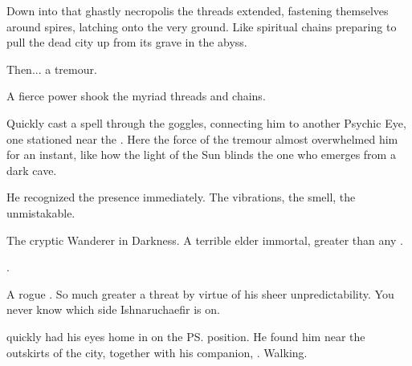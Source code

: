 Down into that ghastly necropolis the threads extended, fastening themselves around spires, latching onto the very ground. 
Like spiritual chains preparing to pull the dead city up from its grave in the abyss. 

Then... a tremour. 

A fierce power shook the myriad threads and chains. 


Quickly \Psyrex{} cast a spell through the goggles, connecting him to another Psychic Eye, one stationed near the \nexus. 
Here the force of the tremour almost overwhelmed him for an instant, like how the light of the Sun blinds the one who emerges from a dark cave. 

He recognized the presence immediately. 
The vibrations, the smell, the \colours unmistakable. 


The cryptic Wanderer in Darkness.
A terrible elder immortal, greater than any \resphan.

\QuessanthIshnaruchaefir.

A rogue \vertex. 
So much greater a threat by virtue of his sheer unpredictability. 
You never know which side Ishnaruchaefir is on. 



\Psyrex{} quickly had his eyes home in on the \ps{\vertex} position. 
He found him near the outskirts of the city, together with his companion, \Criseis. 
Walking. 

